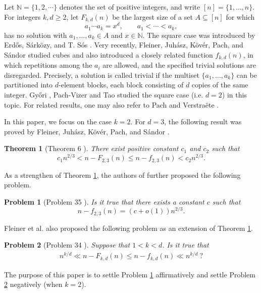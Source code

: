 \documentclass[12pt,a4paper,reqno]{amsart}
\numberwithin{equation}{section}
\newcommand{\N}{\mathbb N}
\newcommand{\1}{\mathbf 1}
\theoremstyle{plain}
\newtheorem{theorem}{Theorem}[section]
\newtheorem{problem}{Problem}
\theoremstyle{definition}
\begin{document}
Let $\N=\{1,2,\cdots\}$ denotes the set of positive integers, and write $[n]=\{1,\ldots,n\}$.  For integers $k,d\geq2$, let
$F_{k,d}(n)$ be the largest size of a set $A\subseteq[n]$ for which
\[
 a_1\cdots a_k=x^d,
 \qquad a_1<\cdots<a_k,
\]
has no solution with $a_1,\ldots,a_k\in A$ and $x\in\mathbb{N}$.  The square
case was introduced by Erd\H{o}s, S\'ark\"ozy, and T. S\'os
\cite{ESS}.  Very recently, Fleiner, Juh\'asz, K\"ov\'er, Pach, and S\'andor
\cite{FJKPS} studied cubes and also introduced a closely related
function $f_{k,d}(n)$, in which repetitions among the $a_i$ are allowed,
and the specified trivial solutions are disregarded. Precisely, a solution is called trivial if the multiset $\{a_1,\ldots,a_k\}$ can be partitioned into $d$-element blocks, each block consisting of $d$ copies of the same integer. Gy\H{o}ri \cite{G},  Pach-Vizer \cite{PV} and Tao \cite{Tao} studied the square case (i.e. $d=2$) in this topic. For related results, one may also refer to Pach \cite{Pach2015,Pach2019} and Verstra\"ete \cite{V}.  


In this paper, we focus on the case $k=2$. For $d=3$, the following result was proved by Fleiner, Juh\'asz, K\"ov\'er, Pach, and S\'andor \cite{FJKPS}.

\begin{theorem}[Theorem 6 \cite{FJKPS}]\label{thm1}There exist positive constant $c_1$ and $c_2$ such that 
$$c_1n^{2/3}<n-F_{2,3}(n)\le n-f_{2,3}(n)<c_2n^{2/3}.$$
\end{theorem}
As a strengthen of Theorem \ref{thm1}, the authors of \cite{FJKPS} further proposed the following problem. 
\begin{problem}[Problem 35 \cite{FJKPS}]\label{P1}Is it true that there exists a constant $c$ such that 
$$n-f_{2,3}(n)=(c+o(1))n^{2/3}.$$
\end{problem}
Fleiner et al. \cite{FJKPS} also proposed the following problem as an extension of Theorem \ref{thm1}.
\begin{problem}[Problem 34 \cite{FJKPS}]\label{P2}Suppose that $1<k<d$. Is it true that
\begin{align}\label{P2eq}
n^{k/d}\ll n-F_{k,d}(n)\leq n-f_{k,d}(n)\ll n^{k/d}\ ?
\end{align}
\end{problem}

The purpose of this paper is to settle Problem \ref{P1} affirmatively and settle Problem \ref{P2} negatively (when
$k=2$).
\end{document}
